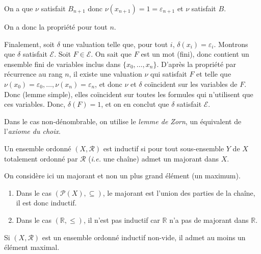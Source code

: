 \documentclass[./main]{subfiles}
\begin{document}
\begin{prv}
\begin{itemize}
\begin{itemize}
\begin{enumerate}
                On a que $\nu$ satisfait $B_{n+1}$ donc $\nu(x_{n+1}) = 1 = \varepsilon_{n+1}$ et $\nu$ satisfait $B$.
            \end{enumerate}
        \end{itemize}
        On a donc la propriété pour tout $n$.
    \end{itemize}
    Finalement, soit $\delta$ une valuation telle que, pour tout $i$, $\delta(x_i) = \varepsilon_i$.
    Montrons que  $\delta$ satisfait  $\mathcal{E}$.
    Soit $F \in \mathcal{E}$.
    On sait que $F$ est un mot (fini), donc contient un ensemble fini de variables inclus dans $\{x_0, \ldots, x_n\}$.
    D'après la propriété par récurrence au rang $n$, il existe une valuation $\nu$
    qui satisfait  $F$ et telle que $\nu(x_0) = \varepsilon_0, \ldots, \nu(x_n) = \varepsilon_n$, et donc  $\nu$ et $\delta$ coïncident sur les variables de $F$.
    Donc (lemme simple), elles coïncident sur toutes les formules qui n'utilisent que ces variables.
    Donc, $\delta(F) = 1$, et on en conclut que  $\delta$ satisfait $\mathcal{E}$.
  \end{prv}

  Dans le cas non-dénombrable, on utilise le \textit{lemme de Zorn}, un équivalent de l'\textit{axiome du choix}.

  \begin{defn}
    Un ensemble ordonné $(X, \mathcal{R})$ est inductif si pour tout sous-ensemble $Y$ de $X$ totalement ordonné par $\mathcal{R}$ (\textit{i.e.} une chaîne) admet un majorant dans $X$.
  \end{defn}

  \begin{rmk}
    On considère ici un majorant et non un plus grand élément (un maximum).
  \end{rmk}

  \begin{exm}
    \begin{enumerate}
      \item Dans le cas $(\mathcal{P}(X), \subseteq )$, le majorant est l'union des parties de la chaîne, il est donc inductif.
      \item Dans le cas $(\mathds{R}, \le)$, il n'est pas inductif car $\mathds{R}$ n'a pas de majorant dans $\mathds{R}$.
    \end{enumerate}
  \end{exm}

  \begin{lem}
    Si $(X, \mathcal{R})$ est un ensemble ordonné inductif non-vide, il admet au moins un élément maximal.
  \end{lem}
\end{document}
